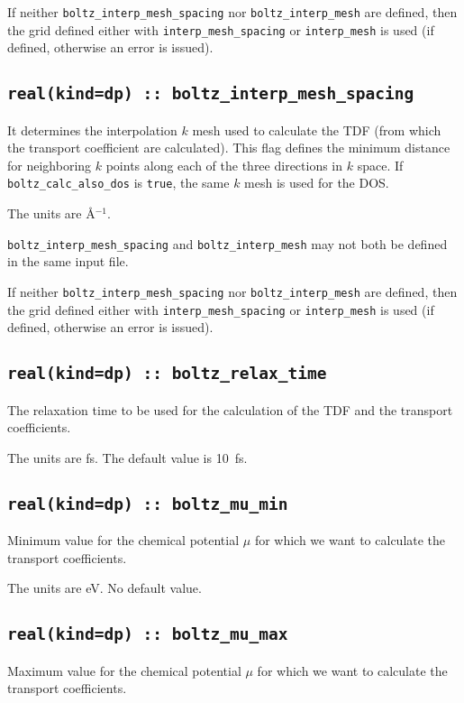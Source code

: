 If neither {\tt boltz\_interp\_mesh\_spacing} nor  {\tt boltz\_interp\_mesh} are defined, then the grid defined either with {\tt interp\_mesh\_spacing} or {\tt interp\_mesh} is used (if defined, otherwise an error is issued).

\subsection[boltz\_interp\_mesh\_spacing]{\tt real(kind=dp) :: boltz\_interp\_mesh\_spacing}
It determines the interpolation $k$ mesh used to calculate the TDF (from which the transport coefficient are calculated). This flag defines the minimum distance for neighboring $k$ points along each of the three directions in $k$ space. If {\tt boltz\_calc\_also\_dos} is \verb#true#, the same $k$ mesh is used for the DOS.

The units are \AA$^{-1}$.

{\tt boltz\_interp\_mesh\_spacing} and  {\tt boltz\_interp\_mesh} may not both be defined in the same input file.

If neither {\tt boltz\_interp\_mesh\_spacing} nor  {\tt boltz\_interp\_mesh} are defined, then the grid defined either with {\tt interp\_mesh\_spacing} or {\tt interp\_mesh} is used (if defined, otherwise an error is issued).

\subsection[boltz\_relax\_time]{\tt real(kind=dp) :: boltz\_relax\_time}
The relaxation time to be used for the calculation of the TDF and the transport coefficients.

The units are fs.
The default value is 10~fs.

\subsection[boltz\_mu\_min]{\tt real(kind=dp) :: boltz\_mu\_min}
Minimum value for the chemical potential $\mu$ for which we want to calculate the transport coefficients.

The units are eV.
No default value.

\subsection[boltz\_mu\_max]{\tt real(kind=dp) :: boltz\_mu\_max}
Maximum value for the chemical potential $\mu$ for which we want to calculate the transport coefficients.

